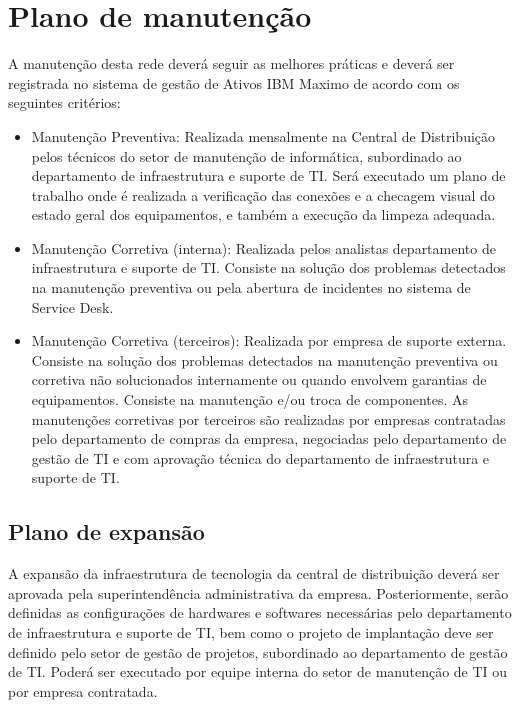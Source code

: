 \documentclass[	DIV=calc,%
							paper=a4,%
							fontsize=12pt,%
							onecolumn]{scrartcl}	 					%
\begin{document}
\section{Plano de manutenção}

A manutenção desta rede deverá seguir as melhores práticas e deverá ser registrada no sistema de gestão de Ativos IBM Maximo de acordo com os seguintes critérios: 
\begin{itemize}
	\item Manutenção Preventiva: Realizada mensalmente na Central de Distribuição pelos técnicos do setor de manutenção de informática, subordinado ao departamento de infraestrutura e suporte de TI. Será executado um plano de trabalho onde é realizada a verificação das conexões e a checagem visual do estado geral dos equipamentos, e também a execução da limpeza adequada. 
	\item Manutenção Corretiva (interna): Realizada pelos analistas departamento de infraestrutura e suporte de TI. Consiste na solução dos problemas detectados na manutenção preventiva ou pela abertura de incidentes no sistema de Service Desk.
	\item Manutenção Corretiva (terceiros): Realizada por empresa de suporte externa. Consiste na solução dos problemas detectados na manutenção preventiva ou corretiva não solucionados internamente ou quando envolvem garantias de equipamentos. Consiste na manutenção e/ou troca de componentes. As manutenções corretivas por terceiros são realizadas por empresas contratadas pelo departamento de compras da empresa, negociadas pelo departamento de gestão de TI e com aprovação técnica do departamento de infraestrutura e suporte de TI.
\end{itemize}

\subsection{Plano de expansão}

A expansão da infraestrutura de tecnologia da central de distribuição deverá ser aprovada pela superintendência administrativa da empresa. Posteriormente, serão definidas as configurações de hardwares e softwares necessárias pelo departamento de infraestrutura e suporte de TI, bem como o projeto de implantação deve ser definido pelo setor de gestão de projetos, subordinado ao departamento de gestão de TI. Poderá ser executado por equipe interna do setor de manutenção de TI ou por empresa contratada. 
\end{document}
